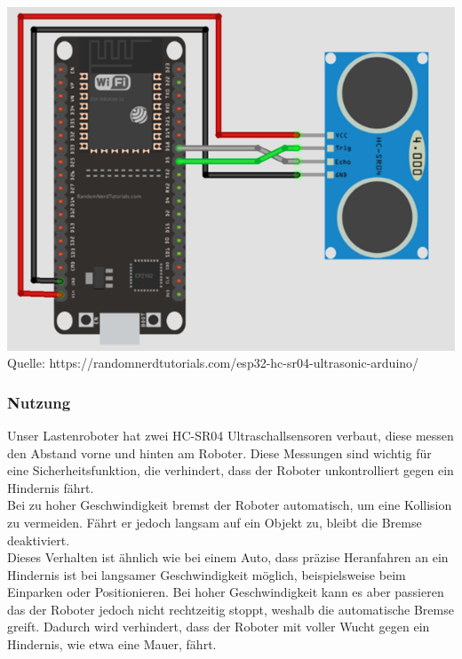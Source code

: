 \documentclass[ngerman,12pt,a4paper]{article}
\begin{document}
		\begin{center}
			\begin{minipage}{0.9\textwidth}
				\centering
				\includegraphics[width=\textwidth]{Pictures/hcsr04_schaltung_bsp}
				\label{fig:hcsr04_schaltung_bsp}
				\vspace{5pt}
				{\small Quelle: {https://randomnerdtutorials.com/esp32-hc-sr04-ultrasonic-arduino/}}
			\end{minipage}
		\end{center}
		\vspace{3pt}
		\subsubsection{Nutzung}
		Unser Lastenroboter hat zwei HC-SR04 Ultraschallsensoren verbaut, diese messen den Abstand vorne und hinten am Roboter. Diese Messungen sind wichtig für eine Sicherheitsfunktion, die verhindert, dass der Roboter unkontrolliert gegen ein Hindernis fährt. \\[0.4cm]
		Bei zu hoher Geschwindigkeit bremst der Roboter automatisch, um eine Kollision zu vermeiden. Fährt er jedoch langsam auf ein Objekt zu, bleibt die Bremse deaktiviert.\\[0.4cm]
		Dieses Verhalten ist ähnlich wie bei einem Auto, dass präzise Heranfahren an ein Hindernis ist bei langsamer Geschwindigkeit möglich, beispielsweise beim Einparken oder Positionieren. Bei hoher Geschwindigkeit kann es aber passieren das der Roboter jedoch nicht rechtzeitig stoppt, weshalb die automatische Bremse greift. Dadurch wird verhindert, dass der Roboter mit voller Wucht gegen ein Hindernis, wie etwa eine Mauer, fährt.\\
\end{document}
